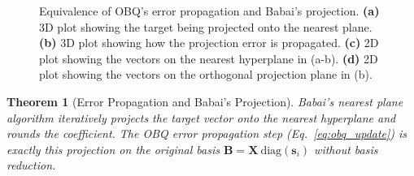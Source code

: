 \documentclass[10pt,a4paper]{amsart}
\newtheorem{theorem}{Theorem}
\begin{document}
\begin{figure}[ht]
\begin{center}

\end{center}
\caption{Equivalence of OBQ's error propagation and Babai's projection. \textbf{(a)} 3D plot showing the target being projected onto the nearest plane. \textbf{(b)} 3D plot showing how the projection error is propagated. \textbf{(c)} 2D plot showing the vectors on the nearest hyperplane in (a-b). \textbf{(d)} 2D plot showing the vectors on the orthogonal projection plane in (b).}
\label{fig:obq_3d}
\end{figure}

\begin{theorem}[Error Propagation and Babai's Projection]
\label{thm:obq_babai}
Babai's nearest plane algorithm iteratively projects the target vector onto the nearest hyperplane and rounds the coefficient.
The OBQ error propagation step (Eq.~\ref{eq:obq_update}) is exactly this projection on the original basis $\bm{B} = \bm{X} \mathrm{\ diag} \left( \bm{s}_{i} \right)$ without basis reduction.
\end{theorem}
\end{document}
